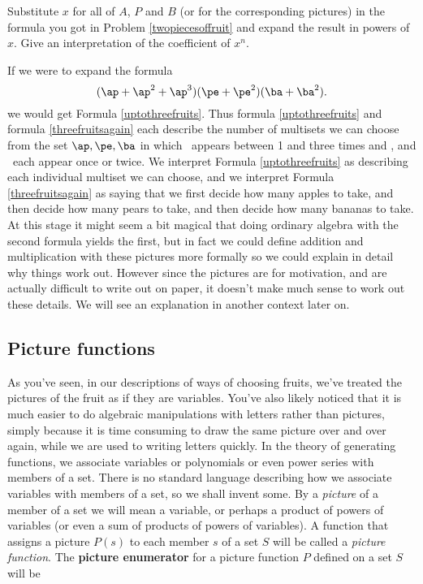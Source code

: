 \iteme Substitute 
$x$ for all of $A$, $P$ and $B$ (or for the corresponding pictures) in
the formula you got in Problem \ref{twopiecesoffruit} and expand the
result in powers of $x$.  Give an interpretation of the coefficient
of $x^n$.
\ep

If we were to expand the formula
\begin{equation}(\ap+\ap^2+\ap^3)(\pe+\pe^2)(\ba+\ba^2).
\label{threefruitsagain}
\end{equation}
we would get Formula \ref{uptothreefruits}.  Thus formula
\ref{uptothreefruits} and formula \ref{threefruitsagain} each describe
the number of multisets we can choose from the set ${\ap,\pe,\ba}$ in
which \ap\ appears  between 1 and three times and \pe, and \ba\ each
appear once or twice.  We interpret Formula \ref{uptothreefruits} as
describing each individual multiset we can choose, and we interpret
Formula
\ref{threefruitsagain} as saying that we first decide how many apples to
take, and then decide how many pears to take, and then decide how many
bananas to take.  At this stage it might seem a bit magical that doing
ordinary algebra with the second formula yields the first, but in fact we
could define addition and multiplication with these pictures more
formally so we could explain in detail why things work out.  However
since the pictures are for motivation, and are actually difficult to
write out on paper, it doesn't make much sense to work out these
details.  We will see an explanation in another context later on.

\subsection{Picture functions}  As you've seen, in our descriptions of
ways of choosing fruits, we've treated the pictures of the fruit as if
they are variables.  You've also likely noticed that it is much easier to
do algebraic manipulations with letters rather than pictures, simply
because it is time consuming to draw the same picture over and over
again, while we are used to writing letters quickly.  In the theory of
generating functions, we associate variables or polynomials or even power
series with members of a set.  There is no standard language describing
how we associate variables with members of a set, so we shall invent
some.  By a {\em picture} of a member of a set we will mean a variable, or
perhaps a product of powers of variables (or even a sum of products of
powers of variables).  A function that assigns a picture $P(s)$ to each
member $s$ of a set $S$ will be called a {\em picture
function}\label{picturefunction}.  The {\bf picture
enumerator} for a picture function
$P$ defined on  a set
$S$ will be 

